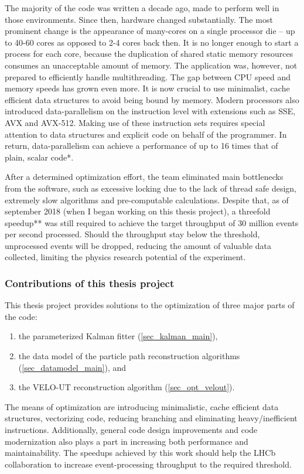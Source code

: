 \documentclass[12pt]{article}
\begin{document}
\vspace{1pc}
The majority of the code was written a decade ago, made to perform well in those environments. Since then, hardware changed substantially. The most prominent change is the appearance of many-cores on a single processor die -- up to 40-60 cores as opposed to 2-4 cores back then. It is no longer enough to start a process for each core, because the duplication of shared static memory resources consumes an unacceptable amount of memory. The application was, however, not prepared to efficiently handle multithreading. The gap between CPU speed and memory speeds has grown even more. It is now crucial to use minimalist, cache efficient data structures to avoid being bound by memory. Modern processors also introduced data-parallelism on the instruction level with extensions such as SSE, AVX and AVX-512. Making use of these instruction sets requires special attention to data structures and explicit code on behalf of the programmer. In return, data-parallelism can achieve a performance of up to 16 times that of plain, scalar code*.

\vspace{1pc}
After a determined optimization effort, the team eliminated main bottlenecks from the software, such as excessive locking due to the lack of thread safe design, extremely slow algorithms and pre-computable calculations. Despite that, as of september 2018 (when I began working on this thesis project), a threefold speedup** was still required to achieve the target throughput of 30 million events per second processed. Should the throughput stay below the threshold, unprocessed events will be dropped, reducing the amount of valuable data collected, limiting the physics research potential of the experiment.

\subsubsection{Contributions of this thesis project}

\vspace{1pc}
This thesis project provides solutions to the optimization of three major parts of the code:
\begin{enumerate}
	\item the parameterized Kalman fitter (\ref{sec_kalman_main}),
	\item the data model of the particle path reconstruction algorithms (\ref{sec_datamodel_main}), and
	\item the VELO-UT reconstruction algorithm (\ref{sec_opt_velout}).
\end{enumerate}
The means of optimization are introducing minimalistic, cache efficient data structures, vectorizing code, reducing branching and eliminating heavy/inefficient instructions. Additionally, general code design improvements and code modernization also plays a part in increasing both performance and maintainability. The speedups achieved by this work should help the LHCb collaboration to increase event-processing throughput to the required threshold.
\end{document}
